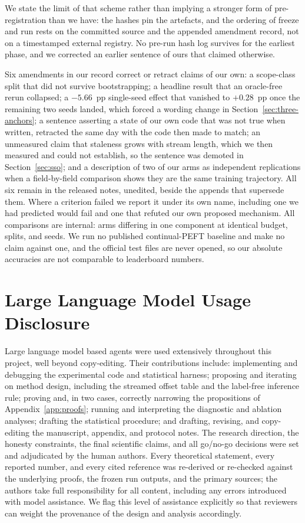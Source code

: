 \documentclass{article}
\begin{document}
We state the limit of that scheme rather than implying a stronger form of
pre-registration than we have: the hashes pin the artefacts, and the ordering of
freeze and run rests on the committed source and the appended amendment record,
not on a timestamped external registry. No pre-run hash log survives for the
earliest phase, and we corrected an earlier sentence of ours that claimed
otherwise.

Six amendments in our record correct or retract claims of our own: a scope-class
split that did not survive bootstrapping; a headline result that an oracle-free
rerun collapsed; a $-5.66$~pp single-seed effect that vanished to $+0.28$~pp once
the remaining two seeds landed, which forced a wording change in
Section~\ref{sec:three-anchors}; a sentence asserting a state of our own code
that was not true when written, retracted the same day with the code then made to
match; an unmeasured claim that staleness grows with stream length, which we then
measured and could not establish, so the sentence was demoted in
Section~\ref{sec:sso}; and a description of two of our arms as independent
replications when a field-by-field comparison shows they are the same training
trajectory. All six remain in the released notes, unedited, beside the appends that
supersede them. Where a criterion failed we
report it under its own name, including one we had predicted would fail and one
that refuted our own proposed mechanism. All comparisons are internal: arms
differing in one component at identical budget, splits, and seeds. We run no
published continual-PEFT baseline and make no claim against one, and the official
test files are never opened, so our absolute accuracies are not comparable to
leaderboard numbers.

\section*{Large Language Model Usage Disclosure}
Large language model based agents were used extensively throughout this project,
well beyond copy-editing. Their contributions include: implementing and debugging
the experimental code and statistical harness; proposing and iterating on method
design, including the streamed offset table and the label-free inference rule;
proving and, in two cases, correctly narrowing the propositions of
Appendix~\ref{app:proofs};
running and interpreting the diagnostic and ablation analyses; drafting the
statistical procedure; and drafting, revising, and copy-editing the manuscript,
appendix, and protocol notes. The research direction, the honesty constraints, the
final scientific claims, and all go/no-go decisions were set and adjudicated by the
human authors. Every theoretical statement, every reported number, and every cited
reference was re-derived or re-checked against the underlying proofs, the frozen run
outputs, and the primary sources; the authors take full responsibility for all
content, including any errors introduced with model assistance. We flag this level
of assistance explicitly so that reviewers can weight the provenance of the design
and analysis accordingly.




\appendix


\end{document}
